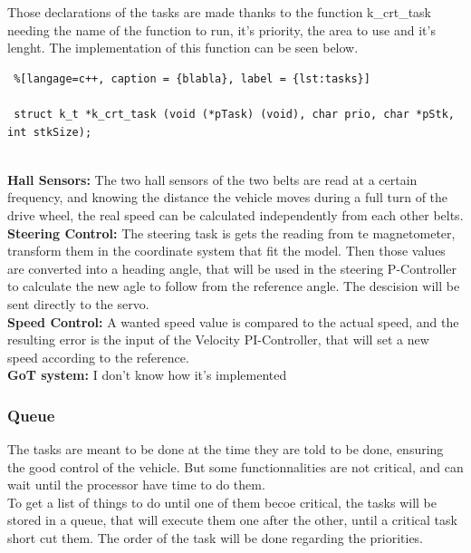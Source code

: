 Those declarations of the tasks are made thanks to the function k_crt_task needing the name of the function to run, it's priority, the area to use and it's lenght. The implementation of this function can be seen below.


\begin{lstlisting} %[langage=c++, caption = {blabla}, label = {lst:tasks}]

 struct k_t *k_crt_task (void (*pTask) (void), char prio, char *pStk, int stkSize);
 
\end{lstlisting}


                       

\textbf{Hall Sensors:}
The two hall sensors of the two belts are read at a certain frequency, and knowing the distance the vehicle moves during a full turn of the drive wheel, the real speed can be calculated independently from each other belts.\\

\textbf{Steering Control:}
The steering task is gets the reading from te magnetometer, transform them in the coordinate system that fit the model. Then those values are converted into a heading angle, that will be used in the steering P-Controller to calculate the new agle to follow from the reference angle. The descision will be sent directly to the servo.\\

\textbf{Speed Control:}
A wanted speed value is compared to the actual speed, and the resulting error is the input of the Velocity PI-Controller, that will set a new speed according to the reference.\\

\textbf{GoT system:}
I don't know how it's implemented



\subsubsection{Queue}
The tasks are meant to be done at the time they are told to be done, ensuring the good control of the vehicle. But some functionnalities are not critical, and can wait until the processor have time to do them.\\
To get a list of things to do until one of them becoe critical, the tasks will be stored in a queue, that will execute them one after the other, until a critical task short cut them. The order of the task will be done regarding the priorities.


